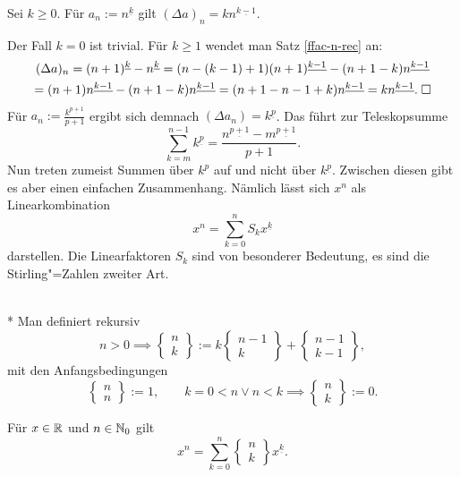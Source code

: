 \begin{Satz}\label{diff-ffac}
Sei $k\ge 0$. Für $a_n:=n^{\underline k}$ gilt
$(\Delta a)_n = kn^{\underline{k-1}}$.
\end{Satz}
 Der Fall $k=0$ ist trivial. Für $k\ge 1$
wendet man Satz \ref{ffac-n-rec} an:
\begin{gather*}
(\Delta a)_n = (n+1)^{\underline k}-n^{\underline k}
= (n-(k-1)+1)(n+1)^{\underline {k-1}}-(n+1-k)n^{\underline{k-1}}\\
= (n+1)n^{\underline{k-1}}-(n+1-k)n^{\underline{k-1}}
= (n+1-n-1+k)n^{\underline{k-1}} = kn^{\underline{k-1}}.\;\Box
\end{gather*}
Für $a_n:=\tfrac{k^{\underline {p+1}}}{p+1}$ ergibt sich
demnach $(\Delta a_n) = k^{\underline p}$. Das führt zur
Teleskopsumme
\[\sum_{k=m}^{n-1} k^{\underline p}
= \frac{n^{\underline{p+1}}-m^{\underline{p+1}}}{p+1}.\]
Nun treten zumeist Summen über $k^p$ auf und nicht
über $k^{\underline p}$. Zwischen diesen gibt es aber einen
einfachen Zusammenhang. Nämlich lässt sich $x^n$ als
Linearkombination
\[x^n = \sum_{k=0}^n S_k x^{\underline k}\]
darstellen. Die Linearfaktoren $S_k$ sind von besonderer
Bedeutung, es sind die Stirling"=Zahlen zweiter Art.
\begin{Definition}\mbox{}\\*
Man definiert rekursiv
\[n>0\implies\begin{Bmatrix}n\\ k\end{Bmatrix} :=
k\begin{Bmatrix}n-1\\ k\end{Bmatrix}
+\begin{Bmatrix}n-1\\ k-1\end{Bmatrix},\]
mit den Anfangsbedingungen
\[\begin{Bmatrix}n\\ n\end{Bmatrix} := 1,\qquad
k=0<n\lor n<k\implies\begin{Bmatrix}n\\ k\end{Bmatrix} := 0.\]
\end{Definition}
\begin{Satz}\label{power-stirling}
Für $x\in\mathbb R$ und $n\in\mathbb N_0$ gilt
\[x^n = \sum_{k=0}^n \begin{Bmatrix}n\\ k\end{Bmatrix} x^{\underline k}.\]
\end{Satz}
